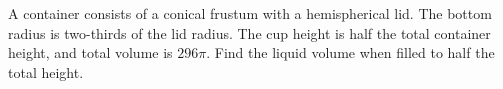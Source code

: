 A container consists of a conical frustum with a hemispherical lid. The bottom radius is two-thirds of the lid radius. The cup height is half the total container height, and total volume is $296\pi$. Find the liquid volume when filled to half the total height.

